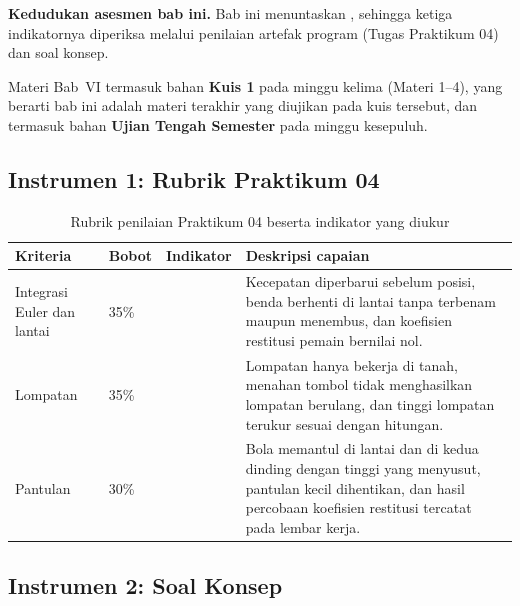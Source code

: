 \label{sec:asesmen-fisika}

\begin{asesmenbox}
\textbf{Kedudukan asesmen bab ini.} Bab ini menuntaskan ,
sehingga ketiga indikatornya diperiksa melalui penilaian artefak program
(Tugas Praktikum 04) dan soal konsep.

\vspace{0.4em}
Materi Bab~VI termasuk bahan \textbf{Kuis 1} pada minggu kelima (Materi 1--4),
yang berarti bab ini adalah materi terakhir yang diujikan pada kuis tersebut,
dan termasuk bahan \textbf{Ujian Tengah Semester} pada minggu kesepuluh.
\end{asesmenbox}

\subsection*{Instrumen 1: Rubrik Praktikum 04}

\begin{table}[htbp]
\centering
\caption{Rubrik penilaian Praktikum 04 beserta indikator yang diukur}
\label{tab:rubrik-praktikum-04}
{\setlength{\tabcolsep}{4pt}\footnotesize%
\begin{tabularx}{\textwidth}{@{}L{3.2cm} C{1.3cm} C{2.1cm} Y@{}}
\toprule
\headrow \textbf{Kriteria} & \textbf{Bobot} & \textbf{Indikator} & \textbf{Deskripsi capaian} \\
\midrule
Integrasi Euler dan lantai & 35\% &  &
Kecepatan diperbarui sebelum posisi, benda berhenti di lantai tanpa terbenam
maupun menembus, dan koefisien restitusi pemain bernilai nol. \\
\addlinespace
Lompatan & 35\% &  &
Lompatan hanya bekerja di tanah, menahan tombol tidak menghasilkan lompatan
berulang, dan tinggi lompatan terukur sesuai dengan hitungan. \\
\addlinespace
Pantulan & 30\% &  &
Bola memantul di lantai dan di kedua dinding dengan tinggi yang menyusut,
pantulan kecil dihentikan, dan hasil percobaan koefisien restitusi tercatat
pada lembar kerja. \\
\bottomrule
\end{tabularx}}
\end{table}

\subsection*{Instrumen 2: Soal Konsep}

